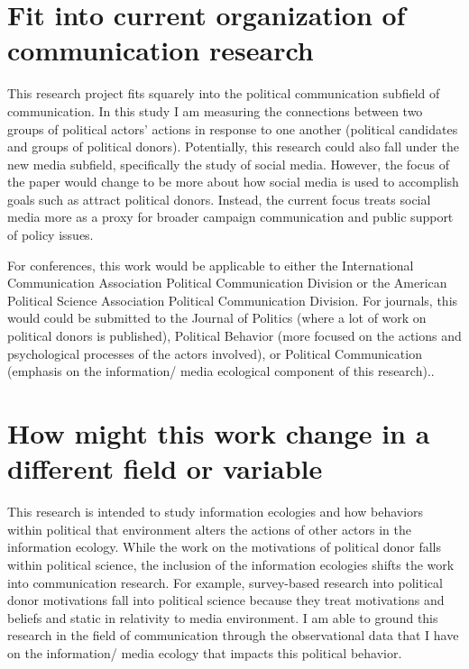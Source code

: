 \documentclass[12pt,]{article}
\begin{document}
\hypertarget{fit-into-current-organization-of-communication-research}{%
\section{Fit into current organization of communication
research}\label{fit-into-current-organization-of-communication-research}}

This research project fits squarely into the political communication
subfield of communication. In this study I am measuring the connections
between two groups of political actors' actions in response to one
another (political candidates and groups of political donors).
Potentially, this research could also fall under the new media subfield,
specifically the study of social media. However, the focus of the paper
would change to be more about how social media is used to accomplish
goals such as attract political donors. Instead, the current focus
treats social media more as a proxy for broader campaign communication
and public support of policy issues.

For conferences, this work would be applicable to either the
International Communication Association Political Communication Division
or the American Political Science Association Political Communication
Division. For journals, this would could be submitted to the Journal of
Politics (where a lot of work on political donors is published),
Political Behavior (more focused on the actions and psychological
processes of the actors involved), or Political Communication (emphasis
on the information/ media ecological component of this research)..

\hypertarget{how-might-this-work-change-in-a-different-field-or-variable}{%
\section{How might this work change in a different field or
variable}\label{how-might-this-work-change-in-a-different-field-or-variable}}

This research is intended to study information ecologies and how
behaviors within political that environment alters the actions of other
actors in the information ecology. While the work on the motivations of
political donor falls within political science, the inclusion of the
information ecologies shifts the work into communication research. For
example, survey-based research into political donor motivations fall
into political science because they treat motivations and beliefs and
static in relativity to media environment. I am able to ground this
research in the field of communication through the observational data
that I have on the information/ media ecology that impacts this
political behavior.
\end{document}
